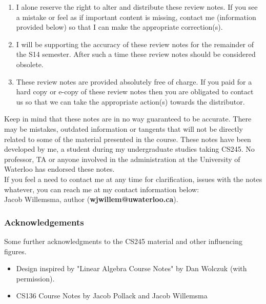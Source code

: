 \documentclass[12pt, twoside, exarticle]{article}
\begin{document}
\begin{enumerate}

\item I alone reserve the right to alter and distribute these review notes. If you see a mistake or feel as if important content is missing, contact me (information provided below) so that I can make the appropriate correction(s).

\item I will be supporting the accuracy of these review notes for the remainder of the S14 semester. After such a time these review notes should be considered obsolete.

\item These review notes are provided absolutely free of charge. If you paid for a hard copy or e-copy of these review notes then you are obligated to contact us so that we can take the appropriate action(s) towards the distributor.

\end{enumerate}

Keep in mind that these notes are in no way guaranteed to be accurate. There may be mistakes, outdated information or tangents that will not be directly related to some of the material presented in the course. These notes have been developed by me, a student during my undergraduate studies taking CS245. No professor, TA or anyone involved in the administration at the University of Waterloo has endorsed these notes.\\

If you feel a need to contact me at any time for clarification, issues with the notes whatever, you can reach me at my contact information below:\\
Jacob Willemsma, author (\textbf{wjwillem@uwaterloo.ca}).\\

\subsubsection*{Acknowledgements}

Some further acknowledgments to the CS245 material and other influencing figures.

\begin{itemize}

\item Design inspired by "Linear Algebra Course Notes" by Dan Wolczuk (with permission).
\item CS136 Course Notes by Jacob Pollack and Jacob Willemsma

\end{itemize}
\clearpage
\thispagestyle{empty}

\renewcommand{\contentsname}{Table of Contents}
\tableofcontents
\clearpage

\setlength{\oddsidemargin}{1.6cm}
\setlength{\evensidemargin}{\oddsidemargin}
\setlength{\marginparwidth}{2.6cm}
\setlength{\marginparsep}{0.25cm}
\end{document}

